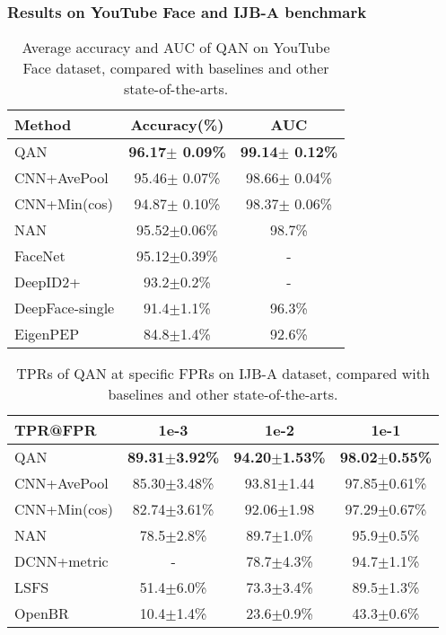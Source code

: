 \documentclass[10pt,twocolumn,letterpaper]{article}
\begin{document}
\subsubsection{Results on YouTube Face and IJB-A benchmark}


\begin{table}[h]
\normalsize
  \centering
  \begin{tabular}{l|c|c}
    \hline
    Method & Accuracy(\%) &AUC \\
    \hline
       QAN   & \bf{96.17$\pm$ 0.09\%} & \bf{99.14$\pm$ 0.12\%} \\
       CNN+AvePool 	 & 95.46$\pm$ 0.07\% & 98.66$\pm$ 0.04\% \\
       CNN+Min(cos)  & 94.87$\pm$ 0.10\% & 98.37$\pm$ 0.06\% \\
    \hline
       NAN\cite{yang2016neural}			 & 95.52$\pm$0.06\% & 98.7\% \\
       FaceNet\cite{schroff2015facenet} 	& 95.12$\pm$0.39\% & - \\
       DeepID2+\cite{sun2015deeply}			& 93.2$\pm$0.2\% & - \\
       DeepFace-single\cite{taigman2014deepface}		& 91.4$\pm$1.1\% & 96.3\% \\
       EigenPEP\cite{li2014eigen}			& 84.8$\pm$1.4\% & 92.6\% \\
    \hline
  \end{tabular}

  \caption{Average accuracy and AUC of QAN on YouTube Face dataset, compared with baselines and other state-of-the-arts.}
  \label{tab:ytf}
\end{table}

\begin{table}[!htbp]
\footnotesize
  \centering
  \begin{tabular}{l|c|c|c}
    \hline
       TPR@FPR & 1e-3 & 1e-2  & 1e-1 \\
    \hline
       QAN 	& \bf{89.31$\pm$3.92\%} & \bf{94.20$\pm$1.53\%} & \bf{98.02$\pm$0.55\%} \\
       CNN+AvePool 		& 85.30$\pm$3.48\% & 93.81$\pm$1.44 & 97.85$\pm$0.61\% \\
       CNN+Min(cos) 	& 82.74$\pm$3.61\% & 92.06$\pm$1.98 & 97.29$\pm$0.67\% \\
    \hline
       NAN\cite{yang2016neural}		&78.5$\pm$2.8\% &89.7$\pm$1.0\% &95.9$\pm$0.5\% \\
       DCNN+metric\cite{chen2015end} 	& - & 78.7$\pm$4.3\% & 94.7$\pm$1.1\% \\
       LSFS\cite{wang2015face}				& 51.4$\pm$6.0\% & 73.3$\pm$3.4\% & 89.5$\pm$1.3\% \\
       OpenBR\cite{klontz2013open}				& 10.4$\pm$1.4\% & 23.6$\pm$0.9\% & 43.3$\pm$0.6\% \\
    \hline
  \end{tabular}
  \caption{TPRs of QAN at specific FPRs on IJB-A dataset, compared with baselines and other state-of-the-arts.}
  \label{tab:ijb}
\end{table}
\end{document}
